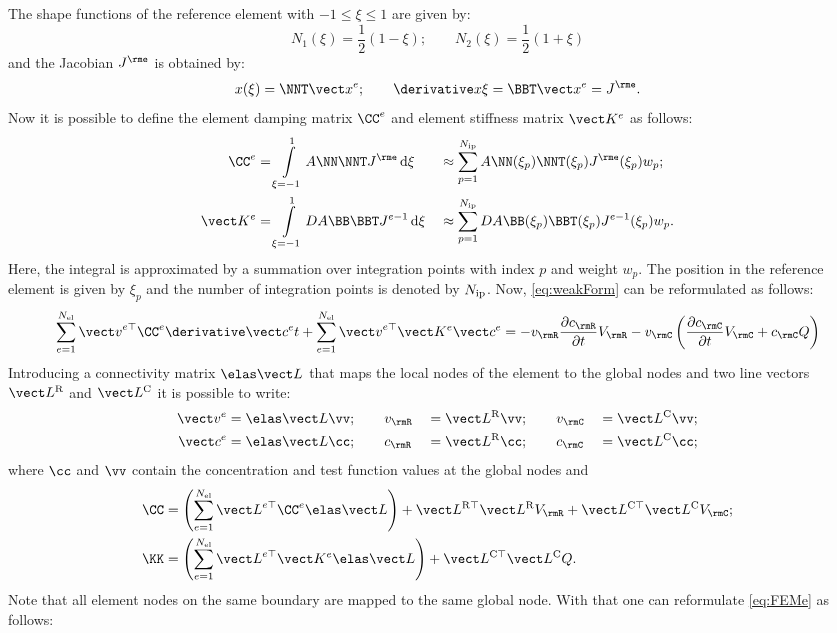   The shape functions of the reference element with $-1\le\xi\le 1$ are given by:
  \begin{equation}
    N_1(\xi) = \frac{1}{2}(1-\xi); \qquad N_2(\xi) = \frac{1}{2}(1+\xi)
  \end{equation}
  and the Jacobian $\Je$ is obtained by:
  \begin{equation}
    x(\xi) = \NNT\xxe ; \qquad \dxDxi = \BBT \xxe = \Je.
  \end{equation}
  Now it is possible to define the element damping matrix $\CC^e$ and element stiffness matrix $\KKe$ as follows:
  \begin{alignat}{2}
    \CC^e &= \intXi A \NN \NNT \Je \,\rmd\xi&&\approx \sumip A \NN(\xi_p) \NNT(\xi_p) \Je(\xi_p) w_p; \label{eq:CCe}\\
    \KKe &= \intXi D A \BB \BBT \Jeinv \,\rmd\xi&&\approx \sumip D A \BB(\xi_p) \BBT(\xi_p) \Jeinv(\xi_p) w_p. \label{eq:KKe}
  \end{alignat}
  Here, the integral is approximated by a summation over integration points with index $p$ and weight $w_p$. The position in the reference element is given by $\xi_p$ and the number of integration points is denoted by $N_{\rm ip}$. Now, \cref{eq:weakForm} can be reformulated as follows:
  \begin{equation}
     \sumel \vveT \CC^e \dcceDt + \sumel \vveT \KKe \cce = - v_\rmR \frac{\partial c_\rmR}{\partial t} V_\rmR - v_\rmC \left( \frac{\partial c_\rmC}{\partial t} V_\rmC + c_\rmC Q\right)
     \label{eq:FEMe}
  \end{equation}
  Introducing a connectivity matrix $\LLe$ that maps the local nodes of the element to the global nodes and two line vectors $\LLR$ and $\LLC$ it is possible to write:
  \begin{alignat}{3}
    \vve &= \LLe \vv; \qquad v_\rmR &&= \LLR \vv; \qquad v_\rmC &&= \LLC \vv; \\
    \cce &= \LLe \cc; \qquad c_\rmR &&= \LLR \cc; \qquad c_\rmC &&= \LLC \cc;
  \end{alignat}
  where $\cc$ and $\vv$ contain the concentration and test function values at the global nodes and
  \begin{align}
    \CC &= \left(\sumel \LLeT \CC^e \LLe\right) + \LLRT\LLR V_\rmR + \LLCT\LLC V_\rmC; \\
    \KK &= \left(\sumel \LLeT \KKe \LLe\right) + \LLCT\LLC Q.
  \end{align}
  Note that all element nodes on the same boundary are mapped to the same global node. With that one can reformulate \cref{eq:FEMe} as follows:

